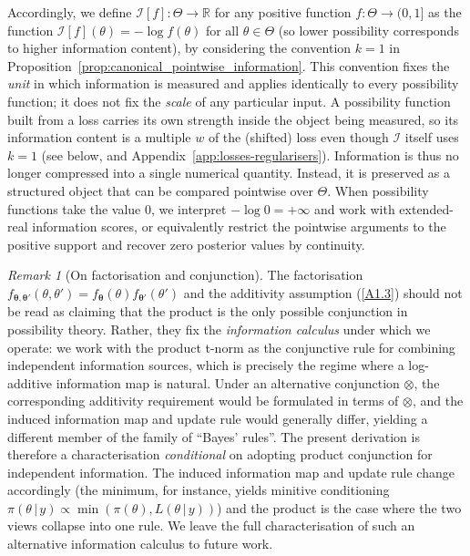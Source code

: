 \documentclass[accepted]{uai2026} %
\def\given{\,|\,}
\theoremstyle{remark}
\newtheorem{remark}{Remark}
\begin{document}
Accordingly, we define $\mathcal{I}[f] : \Theta \to \mathbb{R}$ for any positive function $f:\Theta\to(0,1]$ as the function $\mathcal{I}[f](\theta) = -\log f(\theta)$ for all $\theta \in \Theta$ (so lower possibility corresponds to higher information content), by considering the convention $k=1$ in Proposition~\ref{prop:canonical_pointwise_information}. This convention fixes the \emph{unit} in which information is measured and
applies identically to every possibility function; it does not fix the
\emph{scale} of any particular input. A possibility function built from a loss
carries its own strength inside the object being measured, so its information
content is a multiple $w$ of the (shifted) loss even though $\mathcal{I}$ itself uses $k=1$ (see below, and Appendix~\ref{app:losses-regularisers}). Information is thus no longer compressed into a single numerical quantity. Instead, it is preserved as a structured object that can be compared pointwise over $\Theta$.
When possibility functions take the value $0$, we interpret $-\log 0=+\infty$
and work with extended-real information scores, or equivalently restrict the
pointwise arguments to the positive support and recover zero posterior values by continuity.

\begin{remark}[On factorisation and conjunction]
The factorisation $f_{\bm{\theta},\bm{\theta}'}(\theta,\theta') = f_{\bm{\theta}}(\theta) f_{\bm{\theta}'}(\theta')$ and the additivity assumption (\ref{A1.3}) should not be read as claiming that the product is the only possible conjunction in possibility theory. Rather, they fix the \emph{information calculus} under which we operate: we work with the product t-norm as the conjunctive rule for combining independent information sources, which is precisely the regime where a log-additive information map is natural. Under an alternative conjunction $\otimes$, the corresponding additivity requirement would be formulated in terms of $\otimes$, and the induced information map and update rule would generally differ, yielding a different member of the family of ``Bayes' rules''. The present derivation is therefore a characterisation \emph{conditional} on adopting product conjunction for independent information. The induced information map and update rule change accordingly (the minimum, for instance, yields minitive conditioning $\pi(\theta\given y)\propto\min(\pi(\theta),L(\theta\given y))$) and the product is the case where the two views collapse into one rule.
We leave the full characterisation of such an alternative information calculus to future work.
\end{remark}
\end{document}
